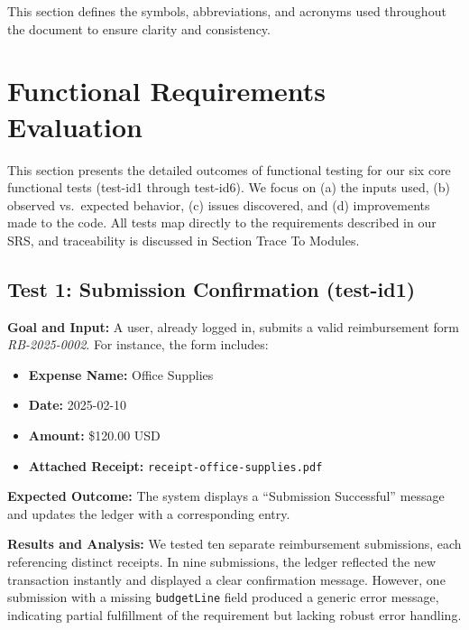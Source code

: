 \documentclass[12pt, titlepage]{article}
\begin{document}
\bigskip

This section defines the symbols, abbreviations, and acronyms used throughout the document to ensure clarity and consistency.

\newpage

\tableofcontents

\listoftables %

\listoffigures %

\newpage


\section{Functional Requirements Evaluation}
\label{sec:FunctionalReqEval}

This section presents the detailed outcomes of functional testing for our six core functional tests (test-id1 through test-id6). We focus on (a) the inputs used, (b) observed vs.\ expected behavior, (c) issues discovered, and (d) improvements made to the code. All tests map directly to the requirements described in our SRS, and traceability is discussed in Section Trace To Modules.

\subsection{Test 1: Submission Confirmation (test-id1)}

\noindent
\textbf{Goal and Input:}  
A user, already logged in, submits a valid reimbursement form \emph{RB-2025-0002}. For instance, the form includes:
\begin{itemize}
  \item \textbf{Expense Name:} Office Supplies
  \item \textbf{Date:} 2025-02-10
  \item \textbf{Amount:} \$120.00 USD
  \item \textbf{Attached Receipt:} \texttt{receipt-office-supplies.pdf}
\end{itemize}
\textbf{Expected Outcome:} The system displays a “Submission Successful” message and updates the ledger with a corresponding entry.

\noindent
\textbf{Results and Analysis:}  
We tested ten separate reimbursement submissions, each referencing distinct receipts. In nine submissions, the ledger reflected the new transaction instantly and displayed a clear confirmation message. However, one submission with a missing \texttt{budgetLine} field produced a generic error message, indicating partial fulfillment of the requirement but lacking robust error handling.
\end{document}
